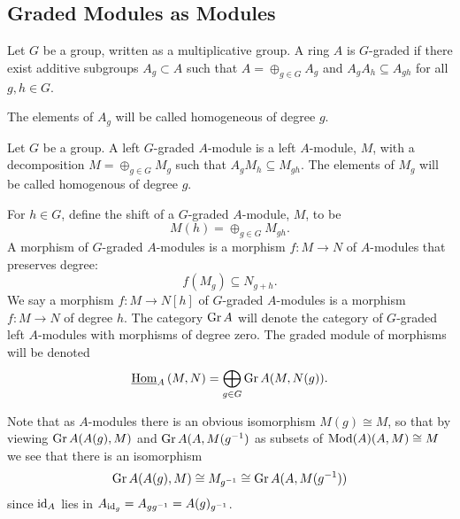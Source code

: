 \documentclass[dissertation.tex]{subfiles}
\begin{document}
\subsection{Graded Modules as Modules}

\begin{defn}
  Let $G$ be a group, written as a multiplicative group.
  A ring $A$ is $G$-graded if there exist additive subgroups $A_g \subset A$ such that $A = \oplus_{g \in G} A_g$ and $A_gA_h \subseteq A_{gh}$ for all $g,h \in G$.
  
  The elements of $A_g$ will be called homogeneous of degree $g$.
\end{defn}

\begin{defn}
  Let $G$ be a group.
  A left $G$-graded $A$-module is a left $A$-module, $M$, with a decomposition $M = \oplus_{g \in G} M_g$ such that $A_gM_h \subseteq M_{gh}$.
  The elements of $M_g$ will be called homogenous of degree $g$.
  
  For $h \in G$, define the shift of a $G$-graded $A$-module, $M$, to be
  $$M(h) = \oplus_{g \in G} M_{gh}.$$
  A morphism of $G$-graded $A$-modules is a morphism $f \colon M \to N$ of $A$-modules that preserves degree:
  $$f(M_g) \subseteq N_{g+h}.$$
  We say a morphism $f \colon M \to N[h]$ of $G$-graded $A$-modules is a morphism $f \colon M \to N$ of degree $h$.
  The category $\operatorname{Gr}A$ will denote the category of $G$-graded left $A$-modules with morphisms of degree zero.
  The graded module of morphisms will be denoted
  $$\operatorname{\underline{Hom}}_{A}\left(M,N\right) = \bigoplus_{g \in G}\operatorname{Gr}A(M,N(g)).$$
\end{defn}

\begin{rmk}
  Note that as $A$-modules there is an obvious isomorphism $M(g) \cong M$, so that by viewing $\operatorname{Gr}A(A(g), M)$ and $\operatorname{Gr}A(A, M(g^{-1})$ as subsets of $\operatorname{Mod}(A)(A, M) \cong M$ we see that there is an isomorphism
$$\operatorname{Gr}A(A(g), M) \cong M_{g^{-1}} \cong \operatorname{Gr}A(A,M(g^{-1}))$$
  since $\operatorname{id}_A$ lies in $A_{\operatorname{id}_g} = A_{gg^{-1}} = A(g)_{g^{-1}}$.
\end{rmk}
\end{document}
